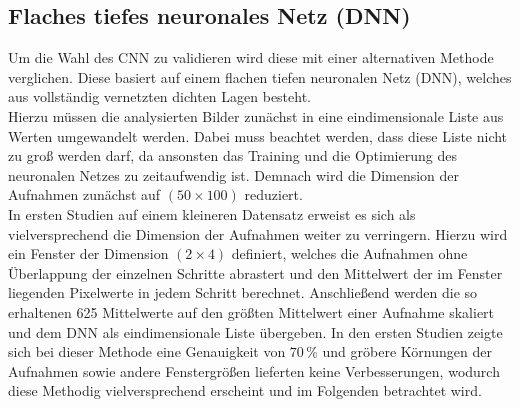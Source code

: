 \subsection{Flaches tiefes neuronales Netz (DNN)}

Um die Wahl des CNN zu validieren wird diese mit einer alternativen Methode verglichen. Diese basiert auf einem flachen tiefen neuronalen Netz (DNN), welches aus vollständig vernetzten dichten Lagen besteht. \\
Hierzu müssen die analysierten Bilder zunächst in eine eindimensionale Liste aus Werten umgewandelt werden. Dabei muss beachtet werden, dass diese Liste nicht zu groß werden darf, da ansonsten das Training und die Optimierung des neuronalen Netzes zu zeitaufwendig ist. Demnach wird die Dimension der Aufnahmen zunächst auf $(50\times 100)$ reduziert.\\
In ersten Studien auf einem kleineren Datensatz erweist es sich als vielversprechend die Dimension der Aufnahmen weiter zu verringern. Hierzu wird ein Fenster der Dimension $(2\times 4)$ definiert, welches die Aufnahmen ohne Überlappung der einzelnen Schritte abrastert und den Mittelwert der im Fenster liegenden Pixelwerte in jedem Schritt berechnet. Anschließend werden die so erhaltenen 625 Mittelwerte auf den größten Mittelwert einer Aufnahme skaliert und dem DNN als eindimensionale Liste übergeben. In den ersten Studien zeigte sich bei dieser Methode eine Genauigkeit von $70\,\%$ und gröbere Körnungen der Aufnahmen sowie andere Fenstergrößen lieferten keine Verbesserungen, wodurch diese Methodig vielversprechend erscheint und im Folgenden betrachtet wird. \\

